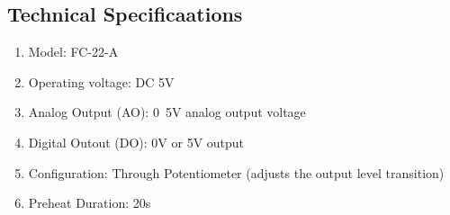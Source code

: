 \subsection*{Technical Specificaations}
\begin{enumerate}
\item Model: FC-22-A
\item Operating voltage: DC 5V
\item Analog Output (AO): 0~5V analog output voltage
\item Digital Outout (DO): 0V or 5V output
\item Configuration: Through Potentiometer (adjusts the output level transition)
\item Preheat Duration: 20s
\end{enumerate}
